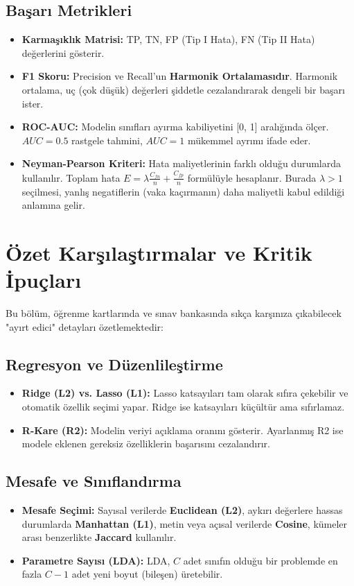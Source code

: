 \documentclass[12pt,a4paper]{article}
\begin{document}
\subsection{Başarı Metrikleri}
\begin{itemize}
    \item \textbf{Karmaşıklık Matrisi:} TP, TN, FP (Tip I Hata), FN (Tip II Hata) değerlerini gösterir.
    \item \textbf{F1 Skoru:} Precision ve Recall'un \textbf{Harmonik Ortalamasıdır}. Harmonik ortalama, uç (çok düşük) değerleri şiddetle cezalandırarak dengeli bir başarı ister.
    \item \textbf{ROC-AUC:} Modelin sınıfları ayırma kabiliyetini [0, 1] aralığında ölçer. $AUC=0.5$ rastgele tahmini, $AUC=1$ mükemmel ayrımı ifade eder.
    \item \textbf{Neyman-Pearson Kriteri:} Hata maliyetlerinin farklı olduğu durumlarda kullanılır. Toplam hata $E = \lambda \frac{C_{fn}}{n} + \frac{C_{fp}}{n}$ formülüyle hesaplanır. Burada $\lambda > 1$ seçilmesi, yanlış negatiflerin (vaka kaçırmanın) daha maliyetli kabul edildiği anlamına gelir.
\end{itemize}


\newpage
\section{Özet Karşılaştırmalar ve Kritik İpuçları}
Bu bölüm, öğrenme kartlarında ve sınav bankasında sıkça karşınıza çıkabilecek "ayırt edici" detayları özetlemektedir:

\subsection{Regresyon ve Düzenlileştirme}
\begin{itemize}
    \item \textbf{Ridge (L2) vs. Lasso (L1):} Lasso katsayıları tam olarak sıfıra çekebilir ve otomatik özellik seçimi yapar. Ridge ise katsayıları küçültür ama sıfırlamaz.
    \item \textbf{R-Kare (R2):} Modelin veriyi açıklama oranını gösterir. Ayarlanmış R2 ise modele eklenen gereksiz özelliklerin başarısını cezalandırır.
\end{itemize}

\subsection{Mesafe ve Sınıflandırma}
\begin{itemize}
    \item \textbf{Mesafe Seçimi:} Sayısal verilerde \textbf{Euclidean (L2)}, aykırı değerlere hassas durumlarda \textbf{Manhattan (L1)}, metin veya açısal verilerde \textbf{Cosine}, kümeler arası benzerlikte \textbf{Jaccard} kullanılır.
    \item \textbf{Parametre Sayısı (LDA):} LDA, $C$ adet sınıfın olduğu bir problemde en fazla $C-1$ adet yeni boyut (bileşen) üretebilir.
\end{itemize}
\end{document}
